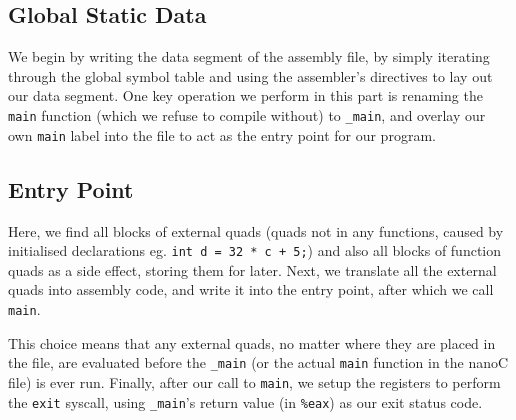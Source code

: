 \documentclass{article}
\begin{document}
\subsection{Global Static Data}{
	We begin by writing the data segment of the assembly file, by simply iterating through the global symbol table and using the assembler's directives to lay out our data segment. One key operation we perform in this part is renaming the \verb|main| function (which we refuse to compile without) to \verb|_main|, and overlay our own \verb|main| label into the file to act as the entry point for our program.
}

\subsection{Entry Point}{
	Here, we find all blocks of external quads (quads not in any functions, caused by initialised declarations eg. \verb|int d = 32 * c + 5;|) and also all blocks of function quads as a side effect, storing them for later. Next, we translate all the external quads into assembly code, and write it into the entry point, after which we call \verb|main|.\bigskip

	This choice means that any external quads, no matter where they are placed in the file, are evaluated before the \verb|_main| (or the actual \verb|main| function in the nanoC file) is ever run. Finally, after our call to \verb|main|, we setup the registers to perform the \verb|exit| syscall, using \verb|_main|'s return value (in \verb|%eax|) as our exit status code.
}
\end{document}
